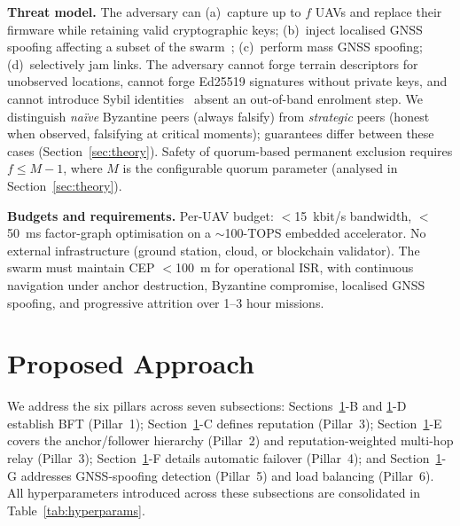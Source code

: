 \documentclass[journal,10pt,twocolumn]{IEEEtran}
\begin{document}
\textbf{Threat model.} The adversary can (a)~capture up to $f$ UAVs and replace their firmware while retaining valid cryptographic keys; (b)~inject localised GNSS spoofing affecting a subset of the swarm~\cite{tippenhauer2011gps}; (c)~perform mass GNSS spoofing; (d)~selectively jam links. The adversary cannot forge terrain descriptors for unobserved locations, cannot forge Ed25519 signatures without private keys, and cannot introduce Sybil identities~\cite{douceur2002sybil} absent an out-of-band enrolment step. We distinguish \emph{na\"ive} Byzantine peers (always falsify) from \emph{strategic} peers (honest when observed, falsifying at critical moments); guarantees differ between these cases (Section~\ref{sec:theory}). Safety of quorum-based permanent exclusion requires $f \leq M-1$, where $M$ is the configurable quorum parameter (analysed in Section~\ref{sec:theory}).

\textbf{Budgets and requirements.} Per-UAV budget: $<$15~kbit/s bandwidth, $<$50~ms factor-graph optimisation on a $\sim$100-TOPS embedded accelerator. No external infrastructure (ground station, cloud, or blockchain validator). The swarm must maintain CEP $<$100~m for operational ISR, with continuous navigation under anchor destruction, Byzantine compromise, localised GNSS spoofing, and progressive attrition over 1--3 hour missions.

\section{Proposed Approach}
\label{sec:approach}

We address the six pillars across seven subsections: Sections~\ref{sec:approach}-B and \ref{sec:approach}-D establish BFT (Pillar~1); Section~\ref{sec:approach}-C defines reputation (Pillar~3); Section~\ref{sec:approach}-E covers the anchor/follower hierarchy (Pillar~2) and reputation-weighted multi-hop relay (Pillar~3); Section~\ref{sec:approach}-F details automatic failover (Pillar~4); and Section~\ref{sec:approach}-G addresses GNSS-spoofing detection (Pillar~5) and load balancing (Pillar~6). All hyperparameters introduced across these subsections are consolidated in Table~\ref{tab:hyperparams}.
\end{document}
